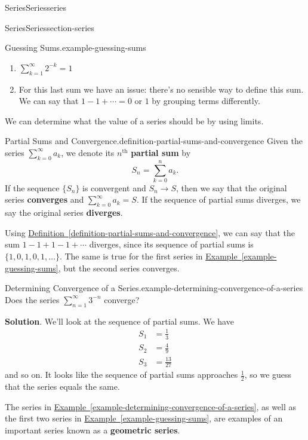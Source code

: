 \documentclass[oneside,10pt,]{book}
\newcommand{\terminology}[1]{\textbf{#1}}
\numberwithin{equation}{section}
\newcommand{\amp}{&}
\begin{document}
\begin{chapterptx}{Series}{}{Series}{}{}{series}
\begin{sectionptx}{Series}{}{Series}{}{}{section-series}
\begin{example}{Guessing Sums.}{example-guessing-sums}
\begin{enumerate}
\item\hypertarget{li-92}{}\(\sum_{k=1}^{\infty}2^{-k} = 1\)%
\item\hypertarget{li-93}{}\hypertarget{p-832}{}%
For this last sum we have an issue: there's no sensible way to define this sum. We can say that \(1 - 1 + \cdots = 0\) or \(1\) by grouping terms differently.%
\end{enumerate}
%
\end{example}
\hypertarget{p-833}{}%
We can determine what the value of a series should be by using limits.%
\begin{definition}{Partial Sums and Convergence.}{definition-partial-sums-and-convergence}%
\hypertarget{p-834}{}%
Given the series \(\sum_{k=0}^{\infty}a_{k}\), we denote its \(n^{\text{th}}\) \terminology{partial sum} by%
\begin{equation*}
S_{n} = \sum_{k=0}^{n}a_{k}\text{.}
\end{equation*}
If the sequence \(\{S_{n}\}\) is convergent and \(S_{n}\to S\), then we say that the original series \terminology{converges} and \(\sum_{k=0}^{\infty}a_{k} = S\). If the sequence of partial sums diverges, we say the original series \terminology{diverges}.%
\end{definition}
\hypertarget{p-835}{}%
Using \hyperref[definition-partial-sums-and-convergence]{Definition~\ref{definition-partial-sums-and-convergence}}, we can say that the sum \(1 - 1 + 1 - 1 + \cdots\) diverges, since its sequence of partial sums is \(\{1,0,1,0,1,\ldots\}\). The same is true for the first series in \hyperref[example-guessing-sums]{Example~\ref{example-guessing-sums}}, but the second series converges.%
\begin{example}{Determining Convergence of a Series.}{example-determining-convergence-of-a-series}%
\hypertarget{p-836}{}%
Does the series \(\sum_{n=1}^{\infty}3^{-n}\) converge?%
\par\smallskip%
\noindent\textbf{Solution}.\hypertarget{solution-172}{}\quad%
\hypertarget{p-837}{}%
We'll look at the sequence of partial sums. We have%
\begin{align*}
S_{1} \amp = \frac{1}{3} \\
S_{2} \amp = \frac{4}{9} \\
S_{3} \amp = \frac{13}{27} 
\end{align*}
and so on. It looks like the sequence of partial sums approaches \(\frac{1}{2}\), so we guess that the series equals the same.%
\end{example}
\hypertarget{p-838}{}%
The series in \hyperref[example-determining-convergence-of-a-series]{Example~\ref{example-determining-convergence-of-a-series}}, as well as the first two series in \hyperref[example-guessing-sums]{Example~\ref{example-guessing-sums}}, are examples of an important series known as a \terminology{geometric series}.%

\end{sectionptx}
\end{chapterptx}
\end{document}
